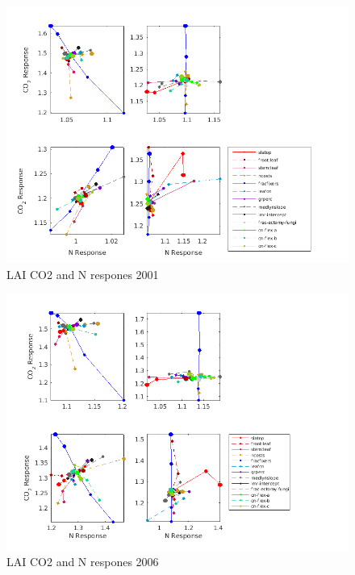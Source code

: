 \documentclass[draft,linenumbers]{agujournal}
\begin{document}
 \begin{figure}[h]
     \centering
     \includegraphics[width=1.55\textwidth, left]{matlab/figures/OCT_CNdep_TLAI1_CLM50defpft_ndep_1x1pt_US-Me2_ens_MIC_p2001.png}
     \caption{LAI CO2 and N respones 2001}
     \label{LAI CO2 and N respones}
  \end{figure}
  

   \begin{figure}[h]
     \centering
     \includegraphics[width=1.55\textwidth, left]{matlab/figures/OCT_CNdep_TLAI1_CLM50defpft_ndep_1x1pt_US-Me2_ens_MIC_p2006.png}
     \caption{LAI CO2 and N respones 2006}
     \label{LAI CO2 and N respones}
  \end{figure}
    
\end{document}
